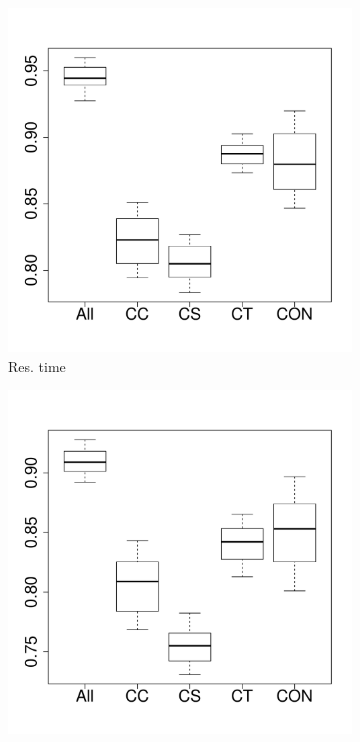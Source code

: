 \documentclass[10pt,journal,compsoc]{IEEEtran}
\begin{document}
\begin{figure}[t]
	\centering
        \begin{subfigure}{0.19\textwidth}
                \includegraphics[width=\linewidth]{Figures/runtime-hadoopkeep-importance.pdf}
                \caption{Res. time}
        \end{subfigure}%
        \begin{subfigure}{0.19\textwidth}
                \includegraphics[width=\linewidth]{Figures/cpu-hadoopkeep-importance.pdf}

\end{subfigure}
\end{figure}
\end{document}
